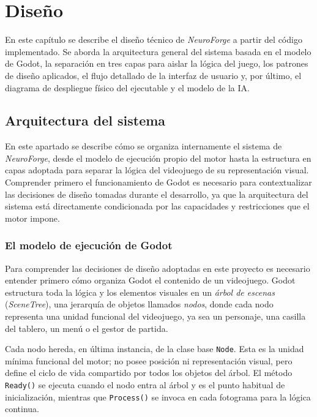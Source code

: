 \chapter{Diseño}

En este capítulo se describe el diseño técnico de \textit{NeuroForge} a partir del código implementado. Se aborda la arquitectura general del sistema basada en el modelo de Godot, la separación en tres capas para aislar la lógica del juego, los patrones de diseño aplicados, el flujo detallado de la interfaz de usuario y, por último, el diagrama de despliegue físico del ejecutable y el modelo de la IA.

\section{Arquitectura del sistema}

En este apartado se describe cómo se organiza internamente el sistema de \textit{NeuroForge}, desde el modelo de ejecución propio del motor hasta la estructura en capas adoptada para separar la lógica del videojuego de su representación visual. Comprender primero el funcionamiento de Godot es necesario para contextualizar las decisiones 
de diseño tomadas durante el desarrollo, ya que la arquitectura del sistema está directamente condicionada por las capacidades y restricciones que el motor impone.

\subsection{El modelo de ejecución de Godot}

Para comprender las decisiones de diseño adoptadas en este proyecto es necesario entender primero cómo organiza Godot el contenido de un videojuego. Godot estructura toda la lógica y los elementos visuales en un \textit{árbol de escenas} (\textit{SceneTree}), una jerarquía de objetos llamados \textit{nodos}, donde cada nodo representa una unidad funcional del videojuego, ya sea un personaje, una casilla del tablero, un menú o el gestor de partida.

Cada nodo hereda, en última instancia, de la clase base \texttt{Node}. Esta es la unidad mínima funcional del motor; no posee posición ni representación visual, pero define el ciclo de vida compartido por todos los objetos del árbol. El método \texttt{Ready()} se ejecuta cuando el nodo entra al árbol y es el punto habitual de inicialización, mientras que \texttt{Process()} se invoca en cada fotograma para la lógica continua.

